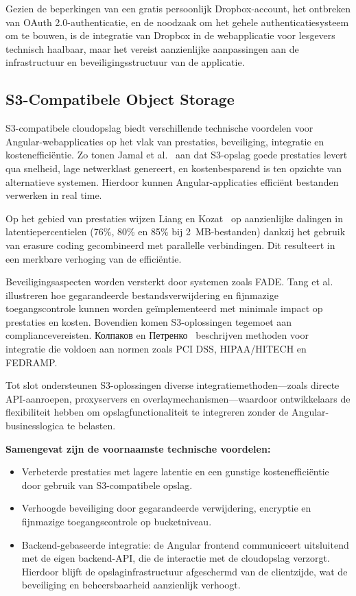 Gezien de beperkingen van een gratis persoonlijk Dropbox-account, het ontbreken van OAuth 2.0-authenticatie, en de noodzaak om het gehele authenticatiesysteem 
om te bouwen, is de integratie van Dropbox in de webapplicatie voor lesgevers technisch haalbaar, maar het vereist aanzienlijke aanpassingen aan de infrastructuur 
en beveiligingsstructuur van de applicatie.

\subsection{S3-Compatibele Object Storage}

S3-compatibele cloudopslag biedt verschillende technische voordelen voor Angular-webapplicaties op het vlak van prestaties, beveiliging, integratie en kostenefficiëntie. Zo tonen Jamal et al.~\cite{Jamal2021Performance} aan dat S3-opslag goede prestaties levert qua snelheid, lage netwerklast genereert, en kostenbesparend is ten opzichte van alternatieve systemen. Hierdoor kunnen Angular-applicaties efficiënt bestanden verwerken in real time.

Op het gebied van prestaties wijzen Liang en Kozat~\cite{Liang2014FAST} op aanzienlijke dalingen in latentiepercentielen (76\%, 80\% en 85\% bij 2~MB-bestanden) dankzij het gebruik van erasure coding gecombineerd met parallelle verbindingen. Dit resulteert in een merkbare verhoging van de efficiëntie.

Beveiligingsaspecten worden versterkt door systemen zoals FADE. Tang et al.~\cite{Tang2010FADE, Tang2012Secure} illustreren hoe gegarandeerde bestandsverwijdering en fijnmazige toegangscontrole kunnen worden geïmplementeerd met minimale impact op prestaties en kosten. Bovendien komen S3-oplossingen tegemoet aan compliancevereisten. Колпаков en Петренко~\cite{kolpakov2018data} beschrijven methoden voor integratie die voldoen aan normen zoals PCI DSS, HIPAA/HITECH en FEDRAMP.

Tot slot ondersteunen S3-oplossingen diverse integratiemethoden—zoals directe API-aanroepen, proxyservers en overlaymechanismen—waardoor ontwikkelaars de flexibiliteit hebben om opslagfunctionaliteit te integreren zonder de Angular-businesslogica te belasten.

\textbf{Samengevat zijn de voornaamste technische voordelen:}
\begin{itemize}
    \item Verbeterde prestaties met lagere latentie en een gunstige kostenefficiëntie door gebruik van S3-compatibele opslag.
    \item Verhoogde beveiliging door gegarandeerde verwijdering, encryptie en fijnmazige toegangscontrole op bucketniveau.
    \item Backend-gebaseerde integratie: de Angular frontend communiceert uitsluitend met de eigen backend-API, die de interactie met de cloudopslag verzorgt. Hierdoor blijft de opslaginfrastructuur afgeschermd van de clientzijde, wat de beveiliging en beheersbaarheid aanzienlijk verhoogt.
\end{itemize}

